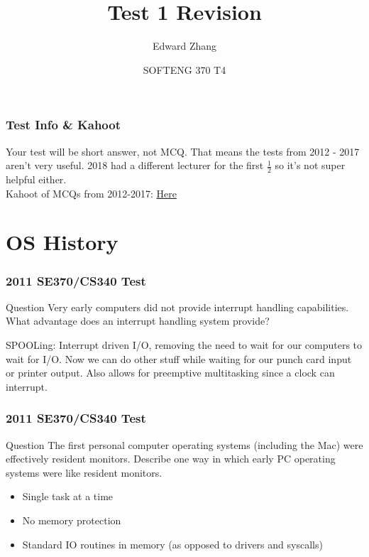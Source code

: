 \documentclass{beamer}
\title[SOFTENG 370 Tutorial 4 (2019)] %
{Test 1 Revision}
\author{Edward Zhang}
\date[August 2019] %
{SOFTENG 370 T4}
\begin{document}
\frame{\titlepage}
\begin{frame}
  \frametitle{Test Info \& Kahoot}
  Your test will be short answer, not MCQ. That means the tests from 2012 - 2017 aren't very useful. 2018 had a different lecturer for the first $\frac{1}{2}$ so it's not super helpful either.\\
  Kahoot of MCQs from 2012-2017: \href{https://create.kahoot.it/share/se370-tests/d7c62e90-bd32-4e2f-99ec-e459d5c7f13d}{Here}
\end{frame}
\section{OS History}
\begin{frame}
  \frametitle{2011 SE370/CS340 Test}
  \begin{block}{Question}
    Very early computers did not provide interrupt handling capabilities. What advantage does an interrupt handling system provide?
  \end{block}
  \pause
  SPOOLing: Interrupt driven I/O, removing the need to wait for our computers to wait for I/O. Now we can do other stuff while waiting for our punch card input or printer output. Also allows for preemptive multitasking since a clock can interrupt.
\end{frame}
\begin{frame}
  \frametitle{2011 SE370/CS340 Test}
  \begin{block}{Question}
    The first personal computer operating systems (including the Mac) were effectively resident monitors. Describe one way in which early PC operating systems were like resident monitors.
  \end{block}
  \pause
  \begin{itemize}
    \item Single task at a time
    \item No memory protection
    \item Standard IO routines in memory (as opposed to drivers and syscalls)
  \end{itemize}
\end{frame}
\end{document}
